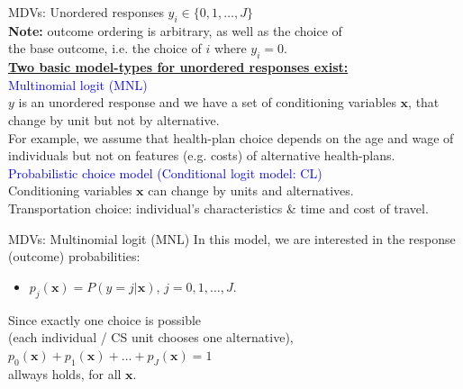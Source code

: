 \documentclass[usenames,dvipsnames]{beamer}
\begin{document}
\begin{frame}{MDVs: Unordered responses}
$y_i \in \{ 0,1, \dots, J \}$ \\
\vspace{0.2cm}
\textbf{Note:} outcome ordering is arbitrary, as well as the choice of \\the base outcome, i.e. the choice of $i$ where $y_i = 0$. \\
\bigskip
\underline{\textbf{Two basic model-types for unordered responses exist:}} \\
\bigskip
\textcolor{Blue}{Multinomial logit (MNL)} \\
$y$ is an unordered response and we have a set of conditioning variables $\bm{x}$, that change by unit but not by alternative. \\For example, we assume that health-plan choice depends on the age and wage of individuals but not on features (e.g. costs) of alternative health-plans. \\
\medskip
\textcolor{Blue}{Probabilistic choice model (Conditional logit model: CL)} \\
Conditioning variables $\bm{x}$ can change by units and alternatives.\\
Transportation choice: individual's characteristics \& time and cost of travel.
\end{frame}
\begin{frame}{MDVs: Multinomial logit (MNL)}
In this model, we are interested in the response (outcome) probabilities: \\
\begin{itemize}
\item[] $p_j (\bm{x}) = P(y= j|\bm{x})$, \qquad $j = 0,1, \dots, J$.
\end{itemize}
\bigskip
Since exactly one choice is possible \\(each individual / CS unit chooses one alternative), \\
\medskip
$p_0 (\bm{x}) + p_1 (\bm{x}) + \dots + p_J (\bm{x}) = 1$ \\
\medskip
allways holds, for all $\bm{x}$.
\end{frame}
\end{document}

